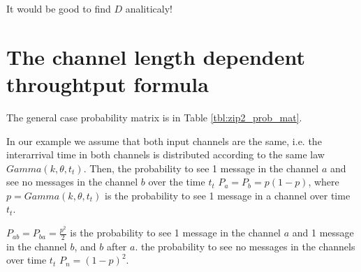It would be good to find $D$ analiticaly!

  \section{The channel length dependent throughtput formula}
The general case probability matrix is in Table \ref{tbl:zip2_prob_mat}.

In our example we assume that both input channels are the same, i.e. the interarrival time in both channels is distributed according to the same law $Gamma(k,\theta,t_t)$. Then, the probability to see 1 message in the channel $a$ and see no messages in the channel $b$ over the time $t_t$ $P_a = P_b = p(1-p)$, where $p = Gamma(k,\theta,t_t)$ is the probability to see 1 message in a channel over time $t_t$.

$P_{ab} = P_{ba} = \frac{p^2}{2}$ is the probability to see 1 message in the channel $a$ and 1 message in the channel $b$, and $b$ after $a$. the probability to see no messages in the channels over time $t_t$ $P_n = (1-p)^2$.


